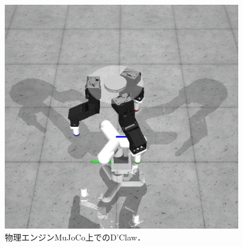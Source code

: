 \documentclass[dvipdfmx]{ampbt_nomag}
\begin{document}

\begin{figure}[hbtp]
  \centering
  \includegraphics[height=10cm]
       {asset/img/dclaw_mujoco.pdf}
  \caption{物理エンジンMuJoCo上でのD'Claw．}
  \label{dclaw_mujoco}
\end{figure}
\end{document}
